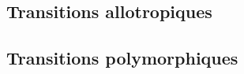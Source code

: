 \documentclass[a4paper]{exam}
\theoremstyle{definition}
\begin{document}
\subsection{Transitions allotropiques}











\subsection{Transitions polymorphiques}





%
%
\end{document}

